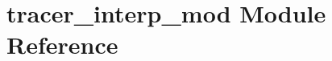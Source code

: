 \hypertarget{namespacetracer__interp__mod}{}\section{tracer\+\_\+interp\+\_\+mod Module Reference}
\label{namespacetracer__interp__mod}
